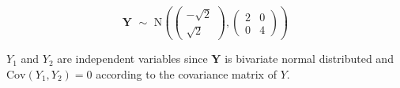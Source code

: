 $$\textbf{Y } \mathtt{\sim} \text{ N}\left(\begin{pmatrix}
-\sqrt{2} \\
\sqrt{2}
\end{pmatrix} , \begin{pmatrix}
2 & 0\\
0  & 4 
\end{pmatrix}\right) $$

$Y_1$ and $Y_2$ are independent variables since $\textbf{Y}$ is bivariate normal distributed and $\text{Cov}(Y_1, Y_2) = 0$ according to the covariance matrix of $Y$. 



